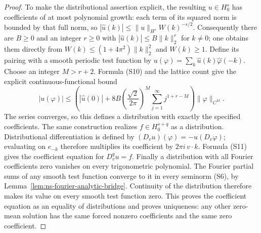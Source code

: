 \begin{proof}
To make the distributional assertion explicit, the resulting
$u\in H^s_0$ has coefficients of at most polynomial growth:
each term of its squared norm is bounded by that full norm, so
$|\widehat u(k)|\leq\|u\|_{H^s}W(k)^{-s/2}$.
Consequently there are $B\geq0$ and an integer $r\geq0$ with
$|\widehat u(k)|\leq B\|k\|_2^r$ for $k\ne0$;
one obtains them directly from
$W(k)\leq(1+4\pi^2)\|k\|_2^2$ and $W(k)\geq1$.
Define its pairing with a smooth periodic test function by
$u(\varphi)=\sum_k\widehat u(k)\widehat\varphi(-k)$.
Choose an integer $M>r+2$. Formula (S10) and the lattice count
give the explicit continuous-functional bound
\[
 |u(\varphi)|\leq
 \left(|\widehat u(0)|+
    8B\left(\frac{\sqrt2}{2\pi}\right)^M
       \sum_{j=1}^{\infty}j^{1+r-M}\right)\|\varphi\|_{C^M}.
\]
The series converges, so this defines a distribution with exactly
the specified coefficients. The same construction realizes
$f\in H^{s+q}_0$ as a distribution. Distributional differentiation
is defined by $(D_vu)(\varphi)=-u(D_v\varphi)$; evaluating on
$e_{-k}$ therefore multiplies its coefficient by $2\pi i\,v\cdot k$.
Formula (S11) gives the coefficient equation for $D_v^qu=f$.
Finally a distribution with all Fourier coefficients zero vanishes
on every trigonometric polynomial. The Fourier partial sums of
any smooth test function converge to it in every seminorm (S6),
by Lemma~\ref{lem:ns-fourier-analytic-bridge}. Continuity of the
distribution therefore makes its value on every smooth test
function zero. This proves the coefficient equation as an equality
of distributions and proves uniqueness: any other zero-mean
solution has the same forced nonzero coefficients and the same
zero coefficient.
\end{proof}

